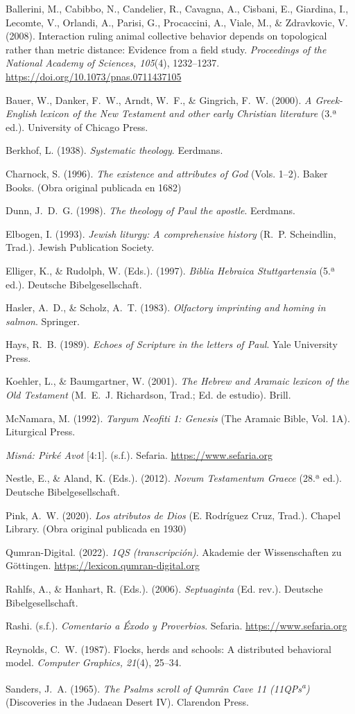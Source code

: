 \documentclass[11pt,letterpaper]{article}
\newcommand{\refapa}[1]{\par{\RaggedRight\hangindent=1.27cm\hangafter=1\noindent #1\par}\vspace{4pt}}
\begin{document}
\refapa{Ballerini, M., Cabibbo, N., Candelier, R., Cavagna, A., Cisbani, E., Giardina, I., Lecomte, V., Orlandi, A., Parisi, G., Procaccini, A., Viale, M., \& Zdravkovic, V. (2008). Interaction ruling animal collective behavior depends on topological rather than metric distance: Evidence from a field study. \emph{Proceedings of the National Academy of Sciences, 105}(4), 1232--1237. \url{https://doi.org/10.1073/pnas.0711437105}}
\refapa{Bauer, W., Danker, F.~W., Arndt, W.~F., \& Gingrich, F.~W. (2000). \emph{A Greek-English lexicon of the New Testament and other early Christian literature} (3.ª ed.). University of Chicago Press.}
\refapa{Berkhof, L. (1938). \emph{Systematic theology}. Eerdmans.}
\refapa{Charnock, S. (1996). \emph{The existence and attributes of God} (Vols. 1--2). Baker Books. (Obra original publicada en 1682)}
\refapa{Dunn, J.~D.~G. (1998). \emph{The theology of Paul the apostle}. Eerdmans.}
\refapa{Elbogen, I. (1993). \emph{Jewish liturgy: A comprehensive history} (R.~P. Scheindlin, Trad.). Jewish Publication Society.}
\refapa{Elliger, K., \& Rudolph, W. (Eds.). (1997). \emph{Biblia Hebraica Stuttgartensia} (5.ª ed.). Deutsche Bibelgesellschaft.}
\refapa{Hasler, A.~D., \& Scholz, A.~T. (1983). \emph{Olfactory imprinting and homing in salmon}. Springer.}
\refapa{Hays, R.~B. (1989). \emph{Echoes of Scripture in the letters of Paul}. Yale University Press.}
\refapa{Koehler, L., \& Baumgartner, W. (2001). \emph{The Hebrew and Aramaic lexicon of the Old Testament} (M.~E.~J. Richardson, Trad.; Ed. de estudio). Brill.}
\refapa{McNamara, M. (1992). \emph{Targum Neofiti 1: Genesis} (The Aramaic Bible, Vol. 1A). Liturgical Press.}
\refapa{\emph{Misná: Pirké Avot} [4:1]. (s.f.). Sefaria. \url{https://www.sefaria.org}}
\refapa{Nestle, E., \& Aland, K. (Eds.). (2012). \emph{Novum Testamentum Graece} (28.ª ed.). Deutsche Bibelgesellschaft.}
\refapa{Pink, A.~W. (2020). \emph{Los atributos de Dios} (E. Rodríguez Cruz, Trad.). Chapel Library. (Obra original publicada en 1930)}
\refapa{Qumran-Digital. (2022). \emph{1QS (transcripción)}. Akademie der Wissenschaften zu Göttingen. \url{https://lexicon.qumran-digital.org}}
\refapa{Rahlfs, A., \& Hanhart, R. (Eds.). (2006). \emph{Septuaginta} (Ed. rev.). Deutsche Bibelgesellschaft.}
\refapa{Rashi. (s.f.). \emph{Comentario a Éxodo y Proverbios}. Sefaria. \url{https://www.sefaria.org}}
\refapa{Reynolds, C.~W. (1987). Flocks, herds and schools: A distributed behavioral model. \emph{Computer Graphics, 21}(4), 25--34.}
\refapa{Sanders, J.~A. (1965). \emph{The Psalms scroll of Qumrân Cave 11 (11QPs\textsuperscript{a})} (Discoveries in the Judaean Desert IV). Clarendon Press.}
\end{document}
